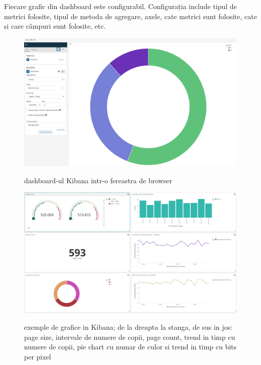 \documentclass[a4paper, 12pt, twoside]{report}
\begin{document}
	Fiecare grafic din dashboard este configurabil. Configurația include tipul de metrici folosite, tipul de metoda de agregare, axele, cate metrici sunt folosite, cate și care câmpuri sunt folosite, etc.
	\begin{figure}
		\centering
		{\includegraphics[width=160mm]{kibana-chart-config.png}}
		\caption{dashboard-ul Kibana intr-o fereastra de browser}
	\end{figure}
	\begin{figure}
		\centering
		{\includegraphics[width=160mm]{dashboard.png}}
		\caption{exemple de grafice in Kibana; de la dreapta la stanga, de sus in jos: page size, intervale de numere de copii, page count, trend in timp cu numere de copii, pie chart cu numar de culor si trend in timp cu bits per pixel}
	\end{figure}
\end{document}
